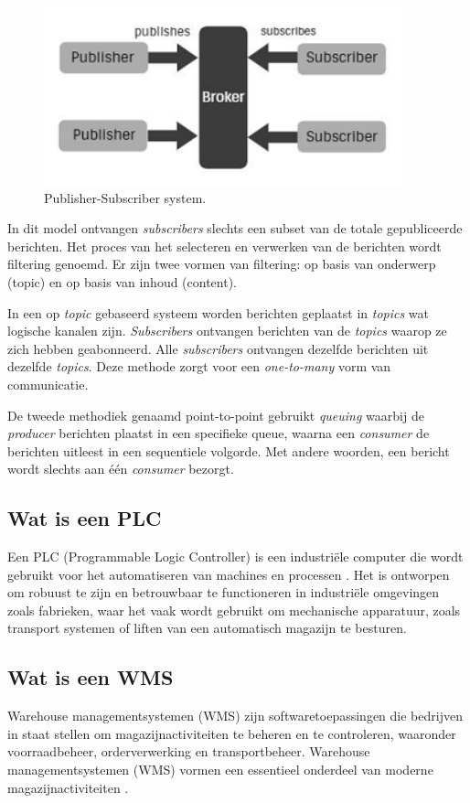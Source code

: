 \begin{figure}[h]
  \centering
  \includegraphics[width=.4\textwidth]{../voorstel/img/fig1-publish-subscribe.png}
  \caption{\label{fig:img}Publisher-Subscriber system\autocite{Sharvari2019}.}
\end{figure}

In dit model ontvangen \emph{subscribers} slechts een subset van de totale gepubliceerde berichten. 
Het proces van het selecteren en verwerken van de berichten wordt filtering genoemd. 
Er zijn twee vormen van filtering: op basis van onderwerp (topic) en op basis van inhoud (content).
\newline

In een op \emph{topic} gebaseerd systeem worden berichten geplaatst in \emph{topics} wat logische kanalen zijn.
\emph{Subscribers} ontvangen berichten van de \emph{topics} waarop ze zich hebben geabonneerd.
Alle \emph{subscribers} ontvangen dezelfde berichten uit dezelfde \emph{topics}. 
Deze methode zorgt voor een \emph{one-to-many} vorm van communicatie.
\newline

De tweede methodiek genaamd point-to-point gebruikt \emph{queuing} waarbij de \emph{producer} berichten plaatst in een specifieke queue, 
waarna een \emph{consumer} de berichten uitleest in een sequentiele volgorde. 
Met andere woorden, een bericht wordt slechts aan één \emph{consumer} bezorgt.

\subsection{Wat is een PLC}
Een PLC (Programmable Logic Controller) is een industriële computer die wordt gebruikt voor het automatiseren van machines en processen \autocite{Bolton2015}. 
Het is ontworpen om robuust te zijn en betrouwbaar te functioneren in industriële omgevingen zoals fabrieken, 
waar het vaak wordt gebruikt om mechanische apparatuur, zoals transport systemen of liften van een automatisch magazijn te besturen.

\subsection{Wat is een WMS}
Warehouse managementsystemen (WMS) zijn softwaretoepassingen die bedrijven in staat stellen om magazijnactiviteiten te beheren en te controleren, 
waaronder voorraadbeheer, orderverwerking en transportbeheer. 
Warehouse managementsystemen (WMS) vormen een essentieel onderdeel van moderne magazijnactiviteiten \autocite{Rana2023}. \newline

